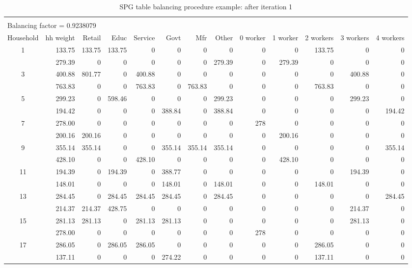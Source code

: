 \begin{sidewaystable}  %
\centering
\caption{SPG table balancing procedure example: after iteration 1}
\label{tab:spg-after-iteration1}
\small
\begin{tabular}{c*{12}{r}}
\vspace{-8pt} \\
\multicolumn{8}{l}{Balancing factor = 0.9238079} \\
\hline
Household & hh weight & Retail & Educ & Service & Govt & Mfr & Other & 0 worker & 1 worker & 2 workers & 3 workers & 4 workers \\
\hline
1 & 133.75 & 133.75 & 133.75 & 0 & 0 & 0 & 0 & 0 & 0 & 133.75 & 0 & 0 \\
\gray 2 & 279.39 & 0 & 0 & 0 & 0 & 0 & 279.39 & 0 & 279.39 & 0 & 0 & 0 \\
3 & 400.88 & 801.77 & 0 & 400.88 & 0 & 0 & 0 & 0 & 0 & 0 & 400.88 & 0 \\
\gray 4 & 763.83 & 0 & 0 & 763.83 & 0 & 763.83 & 0 & 0 & 0 & 763.83 & 0 & 0 \\
5 & 299.23 & 0 & 598.46 & 0 & 0 & 0 & 299.23 & 0 & 0 & 0 & 299.23 & 0 \\
\gray 6 & 194.42 & 0 & 0 & 0 & 388.84 & 0 & 388.84 & 0 & 0 & 0 & 0 & 194.42 \\
7 & 278.00 & 0 & 0 & 0 & 0 & 0 & 0 & 278 & 0 & 0 & 0 & 0 \\
\gray 8 & 200.16 & 200.16 & 0 & 0 & 0 & 0 & 0 & 0 & 200.16 & 0 & 0 & 0 \\
9 & 355.14 & 355.14 & 0 & 0 & 355.14 & 355.14 & 355.14 & 0 & 0 & 0 & 0 & 355.14 \\
\gray 10 & 428.10 & 0 & 0 & 428.10 & 0 & 0 & 0 & 0 & 428.10 & 0 & 0 & 0 \\
11 & 194.39 & 0 & 194.39 & 0 & 388.77 & 0 & 0 & 0 & 0 & 0 & 194.39 & 0 \\
\gray 12 & 148.01 & 0 & 0 & 0 & 148.01 & 0 & 148.01 & 0 & 0 & 148.01 & 0 & 0 \\
13 & 284.45 & 0 & 284.45 & 284.45 & 284.45 & 0 & 284.45 & 0 & 0 & 0 & 0 & 284.45 \\
\gray 14 & 214.37 & 214.37 & 428.75 & 0 & 0 & 0 & 0 & 0 & 0 & 0 & 214.37 & 0 \\
15 & 281.13 & 281.13 & 0 & 281.13 & 281.13 & 0 & 0 & 0 & 0 & 0 & 281.13 & 0 \\
\gray 16 & 278.00 & 0 & 0 & 0 & 0 & 0 & 0 & 278 & 0 & 0 & 0 & 0 \\
17 & 286.05 & 0 & 286.05 & 286.05 & 0 & 0 & 0 & 0 & 0 & 286.05 & 0 & 0 \\
\gray 18 & 137.11 & 0 & 0 & 0 & 274.22 & 0 & 0 & 0 & 0 & 137.11 & 0 & 0 \\

\end{tabular}
\end{sidewaystable}
